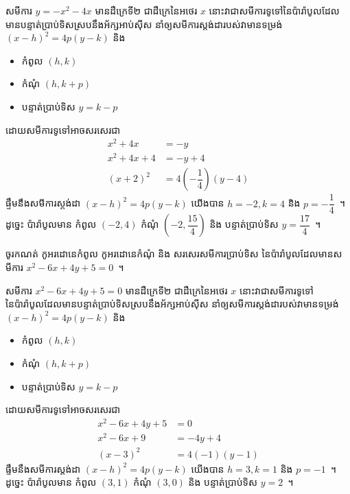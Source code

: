 \begin{answer}
	សមីការ $ y=-x^2-4x $ មានដឺក្រេទី២ ជាដឺក្រេនៃអថេរ $ x $ នោះវាជាសមីការទូទៅនៃប៉ារ៉ាបូលដែលមានបន្ទាត់ប្រាប់ទិសស្របនឹងអ័ក្សអាប់ស៊ីស នាំឲ្យសមីការស្តង់ដារបស់វាមានទម្រង់ $ (x-h)^2=4p(y-k) $ និង
	\begin{itemize}
		\item កំពូល $ (h,k) $
		\item កំណុំ $ (h,k+p) $
		\item បន្ទាត់ប្រាប់ទិស $ y=k-p $
	\end{itemize}
	ដោយសមីការទូទៅអាចសរសេរជា
	\begin{align*}
	x^2+4x &=-y\\
	x^2+4x+4 &=-y+4\\
	(x+2)^2 &=4\left(-\dfrac{1}{4}\right)(y-4)
	\end{align*}
	ផ្ទឹមនឹងសមីការស្តង់ដា $ (x-h)^2=4p(y-k) $ យើងបាន $ h=-2,k=4 $ និង $ p=-\dfrac{1}{4} $~។ ដូច្នេះ ប៉ារ៉ាបូលមាន​ កំពូល $ (-2,4) $ កំណុំ $ \left(-2,\dfrac{15}{4}\right) $ និង បន្ទាត់ប្រាប់ទិស $ y=\dfrac{17}{4} $~។
\end{answer}
%
\begin{example*}
	ចូរកណត់ កូអរដោនេ​កំពូល កូអរដោនេ​កំណុំ និង សរសេរសមីការប្រាប់ទិស នៃប៉ារ៉ាបូលដែលមានសមីការ $ x^2-6x+4y+5=0 $~។
\end{example*}
%
\begin{answer}
	សមីការ $ x^2-6x+4y+5=0 $ មានដឺក្រេទី២ ជាដឺក្រេនៃអថេរ $ x $ នោះវាជាសមីការទូទៅនៃប៉ារ៉ាបូលដែលមានបន្ទាត់ប្រាប់ទិសស្របនឹងអ័ក្សអាប់ស៊ីស នាំឲ្យសមីការស្តង់ដារបស់វាមានទម្រង់ $ (x-h)^2=4p(y-k) $ និង
	\begin{itemize}
		\item កំពូល $ (h,k) $
		\item កំណុំ $ (h,k+p) $
		\item បន្ទាត់ប្រាប់ទិស $ y=k-p $
	\end{itemize}
	ដោយសមីការទូទៅអាចសរសេរជា
	\begin{align*}
	x^2-6x+4y+5 &=0\\
	x^2-6x+9 &=-4y+4\\
	(x-3)^2 &=4(-1)(y-1)
	\end{align*}
	ផ្ទឹមនឹងសមីការស្តង់ដា $ (x-h)^2=4p(y-k) $ យើងបាន $ h=3,k=1 $ និង $ p=-1 $~។ ដូច្នេះ ប៉ារ៉ាបូលមាន​ កំពូល $ (3,1) $ កំណុំ $ (3,0) $ និង បន្ទាត់ប្រាប់ទិស $ y=2 $~។
\end{answer}
%
